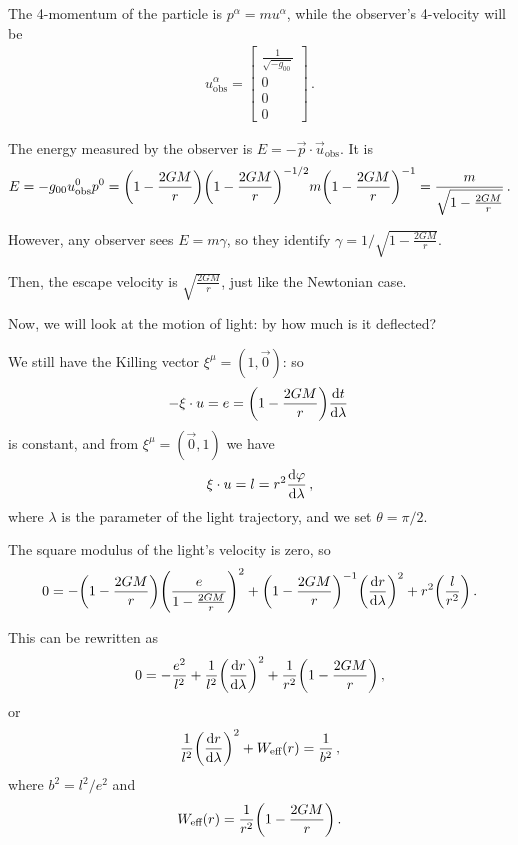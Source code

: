 \documentclass[main.tex]{subfiles}
\begin{document}
The 4-momentum of the particle is \(p^{\alpha } = m u^{\alpha }\), while the observer's 4-velocity will be 
%
\begin{subequations}
\begin{align}
  u _{\text{obs}}^{\alpha } = \left[\begin{array}{c}
  \frac{1}{\sqrt{-g_{00} }} \\ 
  0 \\ 
  0 \\ 
  0
  \end{array}\right]
\,.
\end{align}
\end{subequations}

The energy measured by the observer is \(E = - \vec{p} \cdot \vec{u}_{\text{obs}}\). It is 
%
\begin{align}
  E = - g_{00} u^{0} _{\text{obs}} p^{0}
  = \qty(1 - \frac{2GM}{r}) \qty(1 - \frac{2GM}{r})^{-1/2}
  m \qty(1 - \frac{2GM}{r})^{-1}
  = \frac{m}{\sqrt{1 - \frac{2GM}{r}}}
\,. 
\end{align}
%

However, any observer sees \(E = m \gamma \), so they identify \(\gamma = 1 / \sqrt{1 - \frac{2GM}{r}}\). 

Then, the escape velocity is \(\sqrt{\frac{2GM}{r}}\), just like the Newtonian case. 

Now, we will look at the motion of light: by how much is it deflected? 

We still have the Killing vector \(\xi^{\mu } = (1, \vec{0})\): so 
%
\begin{align}
  - \xi \cdot u = e = \qty(1 - \frac{2GM}{r}) \dv{t}{\lambda } 
\,
\end{align}
%
is constant, and from \(\xi^{\mu }= (\vec{0}, 1)\) we have 
%
\begin{align}
  \xi \cdot u =  l =
  r^2 \dv{\varphi }{\lambda }
\,,
\end{align}
%
where \(\lambda \) is the parameter of the light trajectory, and we set \(\theta = \pi /2\). 

The square modulus of the light's velocity is zero, so 
%
\begin{align}
  0 =
  - \qty(1 - \frac{2GM}{r}) \qty(\frac{e}{1-\frac{2GM}{r}})^2
  + \qty(1 - \frac{2GM}{r})^{-1} \qty(\dv{r}{\lambda })^2 + r^2 \qty(\frac{l}{r^2})
\,. 
\end{align}

This can be rewritten as 
%
\begin{align}
  0= - \frac{e^2}{l^2} + \frac{1}{l^2} \qty(\dv{r}{\lambda })^2 + \frac{1}{r^2} \qty(1 - \frac{2GM}{r})
\,,
\end{align}
%
or 
%
\begin{align}
  \frac{1}{l^2} \qty(\dv{r}{\lambda })^2 + W _{\text{eff}}(r) = \frac{1}{b^2}
\,,
\end{align}
%
where \(b^2 = l^2 / e^2\) and 
%
\begin{align}
  W _{\text{eff}} (r) = \frac{1}{r^2} \qty(1 - \frac{2GM}{r})
\,.
\end{align}
\end{document}
